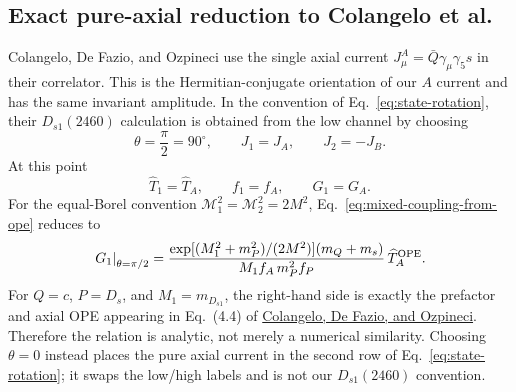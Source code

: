 \documentclass[11pt]{article}
\begin{document}
\subsection{Exact pure-axial reduction to Colangelo et al.}

Colangelo, De Fazio, and Ozpineci use the single axial current
$J^A_\mu=\bar Q\gamma_\mu\gamma_5s$ in their correlator.  This is the
Hermitian-conjugate orientation of our $A$ current and has the same invariant
amplitude.  In the convention of Eq.~\eqref{eq:state-rotation}, their
$D_{s1}(2460)$ calculation is obtained from the low channel by choosing
\begin{equation}
  \boxed{\theta=\frac{\pi}{2}=90^\circ},
  \qquad J_1=J_A,\qquad J_2=-J_B.
  \label{eq:colangelo-angle}
\end{equation}
At this point
\begin{equation}
  \widehat T_1=\widehat T_A,\qquad f_1=f_A,\qquad G_1=G_A.
  \label{eq:pure-axial-identities}
\end{equation}
For the equal-Borel convention
$\mathcal M_1^2=\mathcal M_2^2=2M^2$,
Eq.~\eqref{eq:mixed-coupling-from-ope} reduces to
\begin{equation}
  \left.G_1\right|_{\theta=\pi/2}
  =\frac{\exp[(M_1^2+m_P^2)/(2M^2)](m_Q+m_s)}
  {M_1f_A\,m_P^2f_P}\,\widehat T_A^{\rm OPE}.
  \label{eq:colangelo-formula-limit}
\end{equation}
For $Q=c$, $P=D_s$, and $M_1=m_{D_{s1}}$, the right-hand side is exactly the
prefactor and axial OPE appearing in Eq.~(4.4) of
\href{https://arxiv.org/abs/hep-ph/0505195}{Colangelo, De Fazio, and
Ozpineci}.  Therefore the relation is analytic, not merely a numerical
similarity.  Choosing $\theta=0$ instead places the pure axial current in the
second row of Eq.~\eqref{eq:state-rotation}; it swaps the low/high labels and
is not our $D_{s1}(2460)$ convention.
\end{document}
